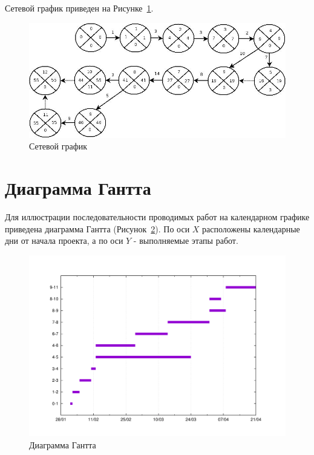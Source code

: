Сетевой график приведен на Рисунке~\ref{fig:netgraph}.
\begin{figure}
\centering
\includegraphics[scale=0.5]{pictures/netgraph}
\caption{Сетевой график}
\label{fig:netgraph}
\end{figure}

\section{Диаграмма Гантта}
Для иллюстрации последовательности проводимых работ на календарном графике приведена диаграмма Гантта (Рисунок~\ref{fig:econom_gant}). По оси $X$ расположены календарные дни от начала проекта, а по оси $Y$ - выполняемые этапы работ.
\begin{figure}
\centering
\includegraphics[scale=0.2]{pictures/gantt}
\caption{Диаграмма Гантта}
\label{fig:econom_gant}
\end{figure}

